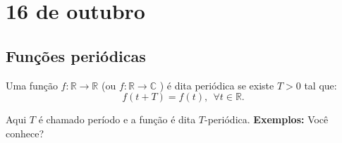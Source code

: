 \documentclass[a4paper,10pt]{book}
\newcommand{\sen}{\operatorname{sen}\,}
\begin{document}
\chapter{16 de outubro}
\section{Funções periódicas}

Uma função $f:\mathbb{R}\to \mathbb{R}$ (ou $f:\mathbb{R}\to \mathbb{C}$ ) é dita periódica se existe $T>0$ tal que:
$$f(t+T)=f(t),~~ \forall t\in \mathbb{R}.$$

Aqui $T$ é chamado período e a função é dita $T$-periódica.
{\bf Exemplos:} Você conhece?

% 
% 
% 
% 
% 
% 

% 
% 
% 
\end{document}

